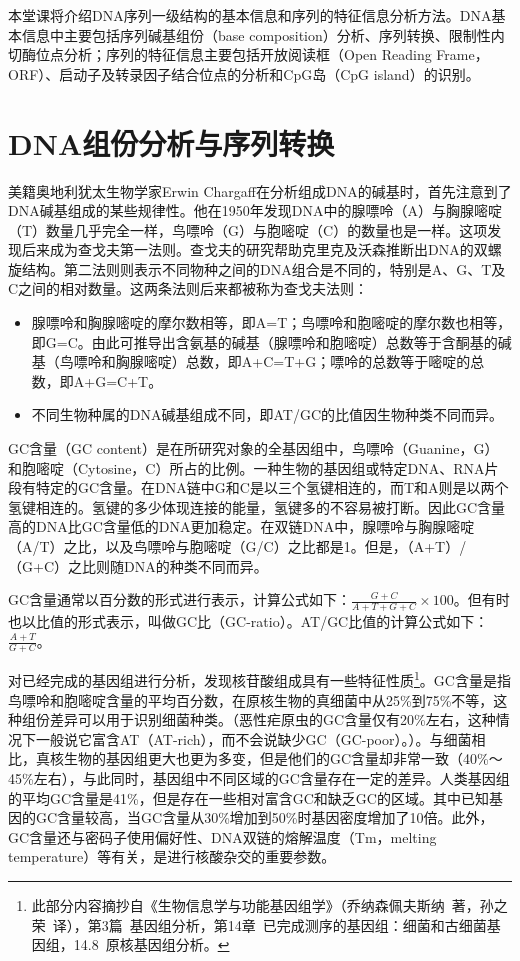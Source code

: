 \documentclass[11pt,a4paper,twoside]{book}
\begin{document}
本堂课将介绍DNA序列一级结构的基本信息和序列的特征信息分析方法。DNA基本信息中主要包括序列碱基组份（base composition）分析、序列转换、限制性内切酶位点分析；序列的特征信息主要包括开放阅读框（Open Reading Frame，ORF）、启动子及转录因子结合位点的分析和CpG岛（CpG island）的识别。

\section{DNA组份分析与序列转换}
美籍奥地利犹太生物学家Erwin Chargaff在分析组成DNA的碱基时，首先注意到了DNA碱基组成的某些规律性。他在1950年发现DNA中的腺嘌呤（A）与胸腺嘧啶（T）数量几乎完全一样，鸟嘌呤（G）与胞嘧啶（C）的数量也是一样。这项发现后来成为查戈夫第一法则。查戈夫的研究帮助克里克及沃森推断出DNA的双螺旋结构。第二法则则表示不同物种之间的DNA组合是不同的，特别是A、G、T及C之间的相对数量。这两条法则后来都被称为查戈夫法则：
\begin{itemize}
  \item 腺嘌呤和胸腺嘧啶的摩尔数相等，即A=T；鸟嘌呤和胞嘧啶的摩尔数也相等，即G=C。由此可推导出含氨基的碱基（腺嘌呤和胞嘧啶）总数等于含酮基的碱基（鸟嘌呤和胸腺嘧啶）总数，即A+C=T+G；嘌呤的总数等于嘧啶的总数，即A+G=C+T。
  \item 不同生物种属的DNA碱基组成不同，即AT/GC的比值因生物种类不同而异。
\end{itemize}

GC含量（GC content）是在所研究对象的全基因组中，鸟嘌呤（Guanine，G）和胞嘧啶（Cytosine，C）所占的比例。一种生物的基因组或特定DNA、RNA片段有特定的GC含量。在DNA链中G和C是以三个氢键相连的，而T和A则是以两个氢键相连的。氢键的多少体现连接的能量，氢键多的不容易被打断。因此GC含量高的DNA比GC含量低的DNA更加稳定。在双链DNA中，腺嘌呤与胸腺嘧啶（A/T）之比，以及鸟嘌呤与胞嘧啶（G/C）之比都是1。但是，（A+T）/（G+C）之比则随DNA的种类不同而异。

GC含量通常以百分数的形式进行表示，计算公式如下：$\frac{G+C}{A+T+G+C}\times100$。但有时也以比值的形式表示，叫做GC比（GC-ratio）。AT/GC比值的计算公式如下：$\frac{A+T}{G+C}$。

对已经完成的基因组进行分析，发现核苷酸组成具有一些特征性质\footnote{此部分内容摘抄自《生物信息学与功能基因组学》（乔纳森\textbullet 佩夫斯纳\ 著，孙之荣\ 译），第3篇\ 基因组分析，第14章\ 已完成测序的基因组：细菌和古细菌基因组，14.8\ 原核基因组分析。}。GC含量是指鸟嘌呤和胞嘧啶含量的平均百分数，在原核生物的真细菌中从25\%到75\%不等，这种组份差异可以用于识别细菌种类。（恶性疟原虫的GC含量仅有20\%左右，这种情况下一般说它富含AT（AT-rich），而不会说缺少GC（GC-poor）。）。与细菌相比，真核生物的基因组更大也更为多变，但是他们的GC含量却非常一致（40\%～45\%左右），与此同时，基因组中不同区域的GC含量存在一定的差异。人类基因组的平均GC含量是41\%，但是存在一些相对富含GC和缺乏GC的区域。其中已知基因的GC含量较高，当GC含量从30\%增加到50\%时基因密度增加了10倍。此外，GC含量还与密码子使用偏好性、DNA双链的熔解温度（Tm，melting temperature）等有关，是进行核酸杂交的重要参数。
\end{document}
